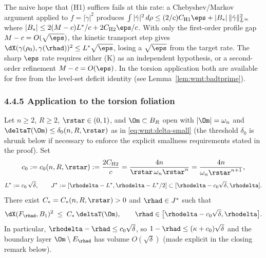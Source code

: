 \begin{remark}
\label{rem:wmt:H1-alone}
The naive hope that (H1) suffices fails at this rate: a Chebyshev/Markov
argument applied to
$f=|\dot\gamma|^2$ produces
$\int|\dot\gamma|^2\,d\rho\le (2/c)C_{\mathrm H1}\eps+
|B_*|\,\|\dot\gamma\|_{L^\infty}^2$ where $|B_*|\le 2(M-c)L^*/c+
2C_{\mathrm H2}\eps/c$. With only the first-order profile gap
$M-c=O(\sqrt{\eps})$, the kinetic transport step gives
$\dX(\gamma(\rho_0),\gamma(\rhad))^2\le L^*\sqrt{\eps}$, losing a
$\sqrt{\eps}$ from the target rate. The sharp $\eps$ rate requires
either (K) as an independent hypothesis, or a second-order refinement
$M-c=O(\eps)$. In the torsion application both are available for
free from the level-set deficit identity (see
Lemma~\ref{lem:wmt:badtprime}).
\end{remark}

\subsubsection{4.4.5 Application to the torsion foliation}
\label{subsec:wmt:application}

\begin{theorem}
\label{thm:wmt:trace}\label{thm:weighted-trace}
Let $n\ge 2$, $R\ge 2$, $\rstar\in(0,1)$, and $\Om\subset
B_R$ open with $|\Om|=\omega_n$ and $\deltaT(\Om)\le
\delta_0(n,R,\rstar)$ as in \eqref{eq:wmt:delta-small} (the threshold
$\delta_0$ is shrunk below if necessary to enforce the explicit
smallness requirements stated in the proof). Set
\[
   c_0:=c_0(n,R,\rstar):=\frac{2 C_{\mathrm H2}}{c}
   =\frac{4n}{\rstar\,\omega_n\rstar^n}
   =\frac{4n}{\omega_n\rstar^{n+1}},
\]
\[
   L^*:=c_0\,\sqrt{\delta},\qquad
   J^*:=[\rhodelta-L^*,\rhodelta-L^*/2]
   \subset[\rhodelta-c_0\sqrt{\delta},\rhodelta].
\]
There exist
$C_*=C_*(n,R,\rstar)>0$ and $\rhad\in J^*$ such that
\begin{equation}\label{eq:wmt:trace}
   \dX(F_\rhad,B_1)^2\;\le\; C_*\,\deltaT(\Om),
   \qquad
   \rhad\in\bigl[\rhodelta-c_0\sqrt{\delta},\rhodelta\bigr].
\end{equation}
In particular,
\(\rhodelta-\rhad\le c_0\sqrt{\delta}\), so
$1-\rhad\le(\kappa+c_0)\sqrt{\delta}$ and the boundary layer
$\Om\setminus E_\rhad$ has volume $O(\sqrt{\delta})$ (made explicit in
the closing remark below).
\end{theorem}


